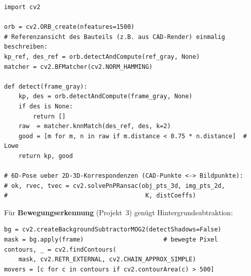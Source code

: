 \begin{lstlisting}[style=py,caption={ORB-Erkennung und Matching (klassisch, kein Training nötig)}]
import cv2

orb = cv2.ORB_create(nfeatures=1500)
# Referenzansicht des Bauteils (z.B. aus CAD-Render) einmalig beschreiben:
kp_ref, des_ref = orb.detectAndCompute(ref_gray, None)
matcher = cv2.BFMatcher(cv2.NORM_HAMMING)

def detect(frame_gray):
    kp, des = orb.detectAndCompute(frame_gray, None)
    if des is None:
        return []
    raw  = matcher.knnMatch(des_ref, des, k=2)
    good = [m for m, n in raw if m.distance < 0.75 * n.distance]  # Lowe
    return kp, good

# 6D-Pose ueber 2D-3D-Korrespondenzen (CAD-Punkte <-> Bildpunkte):
# ok, rvec, tvec = cv2.solvePnPRansac(obj_pts_3d, img_pts_2d,
#                                      K, distCoeffs)
\end{lstlisting}

\noindent Für \textbf{Bewegungserkennung} (Projekt~3) genügt
Hintergrundsubtraktion:
\begin{lstlisting}[style=py,caption={Bewegungserkennung ohne Merkmale}]
bg = cv2.createBackgroundSubtractorMOG2(detectShadows=False)
mask = bg.apply(frame)                      # bewegte Pixel
contours, _ = cv2.findContours(
    mask, cv2.RETR_EXTERNAL, cv2.CHAIN_APPROX_SIMPLE)
movers = [c for c in contours if cv2.contourArea(c) > 500]
\end{lstlisting}
